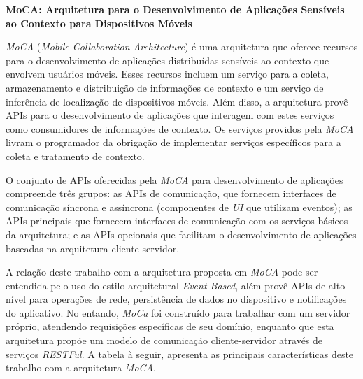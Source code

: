 \textbf{MoCA: Arquitetura para o Desenvolvimento de Aplicações Sensíveis ao Contexto para Dispositivos Móveis} \cite{moca_2004}\par
\textit{MoCA} (\textit{Mobile Collaboration Architecture}) é uma arquitetura que oferece recursos para o desenvolvimento de aplicações distribuídas sensíveis ao contexto que envolvem usuários móveis. Esses recursos incluem um serviço para a coleta, armazenamento e distribuição de informações de contexto e um serviço de inferência de localização de dispositivos móveis. Além disso, a arquitetura provê APIs para o desenvolvimento de aplicações que interagem com estes serviços como consumidores de informações de contexto. Os serviços providos pela \textit{MoCA} livram o programador da obrigação de implementar serviços específicos para a coleta e tratamento de contexto.\par
O conjunto de APIs oferecidas pela \textit{MoCA} para desenvolvimento de aplicações compreende três grupos: as APIs de comunicação, que fornecem interfaces de comunicação síncrona e assíncrona (componentes de \textit{UI} que utilizam eventos); as APIs principais que fornecem interfaces de comunicação com os serviços básicos da arquitetura; e as APIs opcionais que facilitam o desenvolvimento de aplicações baseadas na arquitetura cliente-servidor.\par

A relação deste trabalho com a arquitetura proposta em \textit{MoCA} pode ser entendida pelo uso do estilo arquitetural \textit{Event Based}, além provê APIs de alto nível para operações de rede, persistência de dados no dispositivo e notificações do aplicativo. No entando, \textit{MoCa} foi construído para trabalhar com um servidor próprio, atendendo requisições específicas de seu domínio, enquanto que esta arquitetura propõe um modelo de comunicação cliente-servidor através de serviços \textit{RESTFul}. A tabela à seguir, apresenta as principais características deste trabalho com a arquitetura \textit{MoCA}.


